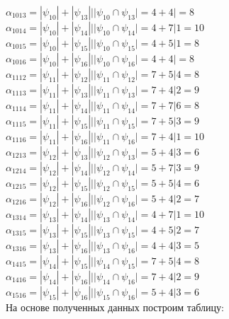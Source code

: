 \documentclass[12pt,a4paper]{report}
\begin{document}
$\alpha_{1013} = |\psi_{10}| + |\psi_{13}| | |\psi_{10} \cap \psi_{13}| = 4 + 4 |   = 8$ \\
$\alpha_{1014} = |\psi_{10}| + |\psi_{14}| | |\psi_{10} \cap \psi_{14}| = 4 + 7 | 1 = 10$ \\
$\alpha_{1015} = |\psi_{10}| + |\psi_{15}| | |\psi_{10} \cap \psi_{15}| = 4 + 5 | 1 = 8$ \\
$\alpha_{1016} = |\psi_{10}| + |\psi_{16}| | |\psi_{10} \cap \psi_{16}| = 4 + 4 |   = 8$ \\
$\alpha_{1112} = |\psi_{11}| + |\psi_{12}| | |\psi_{11} \cap \psi_{12}| = 7 + 5 | 4 = 8$ \\
$\alpha_{1113} = |\psi_{11}| + |\psi_{13}| | |\psi_{11} \cap \psi_{13}| = 7 + 4 | 2 = 9$ \\
$\alpha_{1114} = |\psi_{11}| + |\psi_{14}| | |\psi_{11} \cap \psi_{14}| = 7 + 7 | 6 = 8$ \\
$\alpha_{1115} = |\psi_{11}| + |\psi_{15}| | |\psi_{11} \cap \psi_{15}| = 7 + 5 | 3 = 9$ \\
$\alpha_{1116} = |\psi_{11}| + |\psi_{16}| | |\psi_{11} \cap \psi_{16}| = 7 + 4 | 1 = 10$ \\
$\alpha_{1213} = |\psi_{12}| + |\psi_{13}| | |\psi_{12} \cap \psi_{13}| = 5 + 4 | 3 = 6$ \\
$\alpha_{1214} = |\psi_{12}| + |\psi_{14}| | |\psi_{12} \cap \psi_{14}| = 5 + 7 | 3 = 9$ \\
$\alpha_{1215} = |\psi_{12}| + |\psi_{15}| | |\psi_{12} \cap \psi_{15}| = 5 + 5 | 4 = 6$ \\
$\alpha_{1216} = |\psi_{12}| + |\psi_{16}| | |\psi_{12} \cap \psi_{16}| = 5 + 4 | 2 = 7$ \\
$\alpha_{1314} = |\psi_{13}| + |\psi_{14}| | |\psi_{13} \cap \psi_{14}| = 4 + 7 | 1 = 10$ \\
$\alpha_{1315} = |\psi_{13}| + |\psi_{15}| | |\psi_{13} \cap \psi_{15}| = 4 + 5 | 2 = 7$ \\
$\alpha_{1316} = |\psi_{13}| + |\psi_{16}| | |\psi_{13} \cap \psi_{16}| = 4 + 4 | 3 = 5$ \\
$\alpha_{1415} = |\psi_{14}| + |\psi_{15}| | |\psi_{14} \cap \psi_{15}| = 7 + 5 | 4 = 8$ \\
$\alpha_{1416} = |\psi_{14}| + |\psi_{16}| | |\psi_{14} \cap \psi_{16}| = 7 + 4 | 2 = 9$ \\
$\alpha_{1516} = |\psi_{15}| + |\psi_{16}| | |\psi_{15} \cap \psi_{16}| = 5 + 4 | 3 = 6$ \\
\hfill\break
На основе полученных данных построим таблицу:\\
\end{document}
